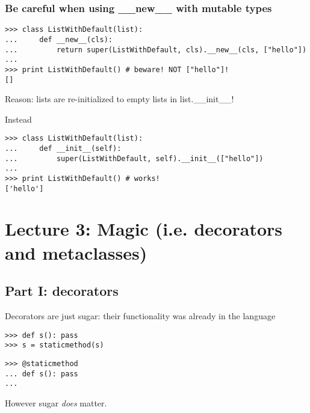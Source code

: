 \documentclass[10pt,a4paper,english]{article}
\begin{document}
\subsubsection*{Be careful when using {\_}{\_}new{\_}{\_} with mutable types}
\begin{verbatim}>>> class ListWithDefault(list):
...     def __new__(cls):
...         return super(ListWithDefault, cls).__new__(cls, ["hello"])
...
>>> print ListWithDefault() # beware! NOT ["hello"]!
[]\end{verbatim}

Reason: lists are re-initialized to empty lists in list.{\_}{\_}init{\_}{\_}!

Instead
\begin{verbatim}>>> class ListWithDefault(list):
...     def __init__(self):
...         super(ListWithDefault, self).__init__(["hello"])
...
>>> print ListWithDefault() # works!
['hello']\end{verbatim}



\hypertarget{lecture-3-magic-i-e-decorators-and-metaclasses}{}
\section*{Lecture 3: Magic (i.e. decorators and metaclasses)}



\hypertarget{part-i-decorators}{}
\subsection*{Part I: decorators}

Decorators are just sugar: their functionality was already in the language
\begin{verbatim}>>> def s(): pass
>>> s = staticmethod(s)\end{verbatim}
\begin{verbatim}>>> @staticmethod
... def s(): pass
...\end{verbatim}

However sugar \emph{does} matter.


\end{document}

